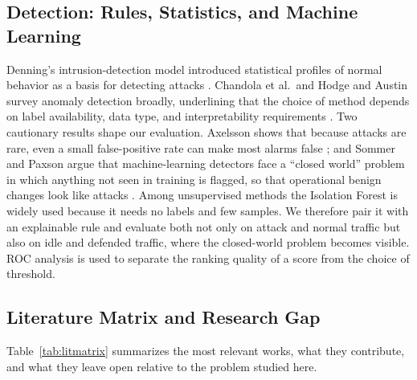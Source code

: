 \subsection{Detection: Rules, Statistics, and Machine Learning}
Denning's intrusion-detection model introduced statistical profiles of normal behavior
as a basis for detecting attacks \cite{denning1987}. Chandola et al.\ and Hodge and
Austin survey anomaly detection broadly, underlining that the choice of method
depends on label availability, data type, and interpretability requirements
\cite{chandola2009,hodge2004}. Two cautionary results shape our evaluation. Axelsson
shows that because attacks are rare, even a small false-positive rate can make most
alarms false \cite{axelsson2000}; and Sommer and Paxson argue that machine-learning
detectors face a ``closed world'' problem in which anything not seen in training is
flagged, so that operational benign changes look like attacks \cite{sommer2010}. Among
unsupervised methods the Isolation Forest \cite{liu2008,liu2012} is widely used because
it needs no labels and few samples. We therefore pair it with an explainable rule and
evaluate both not only on attack and normal traffic but also on idle and defended
traffic, where the closed-world problem becomes visible. ROC analysis \cite{fawcett2006}
is used to separate the ranking quality of a score from the choice of threshold.

\subsection{Literature Matrix and Research Gap}
Table~\ref{tab:litmatrix} summarizes the most relevant works, what they contribute, and
what they leave open relative to the problem studied here.

